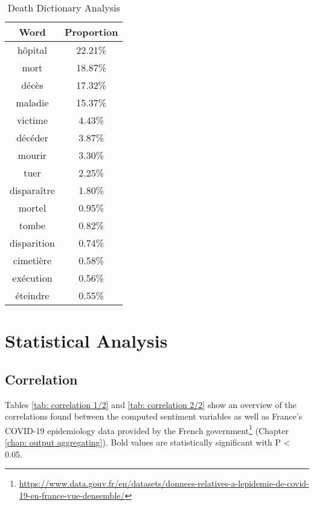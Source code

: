\begin{table}[]
\caption{Death Dictionary Analysis}
\label{tab:death freqs}
\centering
\begin{tabular}{@{}cc@{}}
\toprule
Word      & Proportion \\ \midrule
hôpital     & 22.21\% \\
mort        & 18.87\% \\
décès       & 17.32\% \\
maladie     & 15.37\% \\
victime     & 4.43\%  \\
décéder     & 3.87\%  \\
mourir      & 3.30\%  \\
tuer        & 2.25\%  \\
disparaître & 1.80\%  \\
mortel      & 0.95\%  \\
tombe       & 0.82\%  \\
disparition & 0.74\%  \\
cimetière   & 0.58\%  \\
exécution   & 0.56\%  \\
éteindre    & 0.55\%  \\ \bottomrule
\end{tabular}
\end{table}

\section{Statistical Analysis}

\subsection{Correlation}

Tables \ref{tab: correlation 1/2} and  \ref{tab: correlation 2/2} show an overview of the correlations found between the computed sentiment variables as well as France's COVID-19 epidemiology data provided by the French government\footnote{\url{https://www.data.gouv.fr/en/datasets/donnees-relatives-a-lepidemie-de-covid-19-en-france-vue-densemble/}} (Chapter \ref{chap: output aggregating}). Bold values are statistically significant with P < 0.05.

